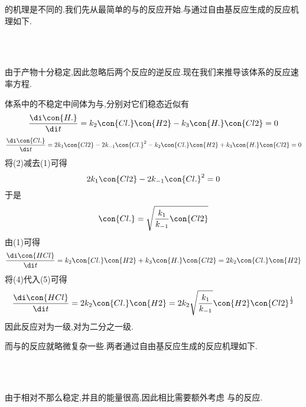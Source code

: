 \documentclass{ctexart}
\begin{document}
的机理是不同的.我们先从最简单的与的反应开始.与通过自由基反应生成的反应机理如下.
\begin{tightcenter}
    \\
    \\
\end{tightcenter}
由于产物十分稳定,因此忽略后两个反应的逆反应.现在我们来推导该体系的反应速率方程.
\begin{derivation}\setcounter{equation}{0}
    体系中的不稳定中间体为与,分别对它们稳态近似有
    \begin{equation}
        \dfrac{\di\con{H.}}{\di t}=k_2\con{Cl.}\con{H2}-k_3\con{H.}\con{Cl2}=0
    \end{equation}
    \begin{equation}
        \dfrac{\di\con{Cl.}}{\di t}=2k_1\con{Cl2}-2k_{-1}\con{Cl.}^2-k_2\con{Cl.}\con{H2}+k_3\con{H.}\con{Cl2}=0
    \end{equation}
    将(2)减去(1)可得
    \begin{equation}
        2k_1\con{Cl2}-2k_{-1}\con{Cl.}^2=0
    \end{equation}
    于是
    \begin{equation}
        \con{Cl.}=\sqrt{\dfrac{k_1}{k_{-1}}\con{Cl2}}
    \end{equation}
    由(1)可得
    \begin{equation}
        \dfrac{\di\con{HCl}}{\di t}=k_2\con{Cl.}\con{H2}+k_3\con{H.}\con{Cl2}=2k_2\con{Cl.}\con{H2}
    \end{equation}
    将(4)代入(5)可得
    \begin{equation}
        \dfrac{\di\con{HCl}}{\di t}=2k_2\con{Cl.}\con{H2}=2k_2\sqrt{\dfrac{k_1}{k_{-1}}}\con{H2}\con{Cl2}^{\frac12}
    \end{equation}
    因此反应对为一级,对为二分之一级.
\end{derivation}
而与的反应就略微复杂一些.两者通过自由基反应生成的反应机理如下.
\begin{tightcenter}
    \\
    \\
\end{tightcenter}
由于相对不那么稳定,并且的能量很高,因此相比需要额外考虑%
与的反应.
\end{document}
